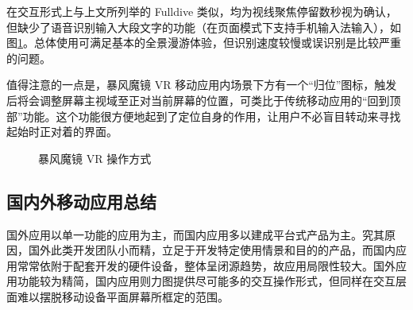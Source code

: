 在交互形式上与上文所列举的 Fulldive 类似，均为视线聚焦停留数秒视为确认，但缺少了语音识别输入大段文字的功能（在页面模式下支持手机输入法输入），如图\ref{fig:storm}。总体使用可满足基本的全景漫游体验，但识别速度较慢或误识别是比较严重的问题。

值得注意的一点是，暴风魔镜 VR 移动应用内场景下方有一个“归位”图标，触发后将会调整屏幕主视域至正对当前屏幕的位置，可类比于传统移动应用的“回到顶部”功能。这个功能很方便地起到了定位自身的作用，让用户不必盲目转动来寻找起始时正对着的界面。


\begin{figure}[htp]
\centering
{}
\caption{暴风魔镜 VR 操作方式}
\label{fig:storm}
\end{figure}

\subsection{国内外移动应用总结}
国外应用以单一功能的应用为主，而国内应用多以建成平台式产品为主。究其原因，国外此类开发团队小而精，立足于开发特定使用情景和目的的产品，而国内应用常常依附于配套开发的硬件设备，整体呈闭源趋势，故应用局限性较大。国外应用功能较为精简，国内应用则力图提供尽可能多的交互操作形式，但同样在交互层面难以摆脱移动设备平面屏幕所框定的范围。
